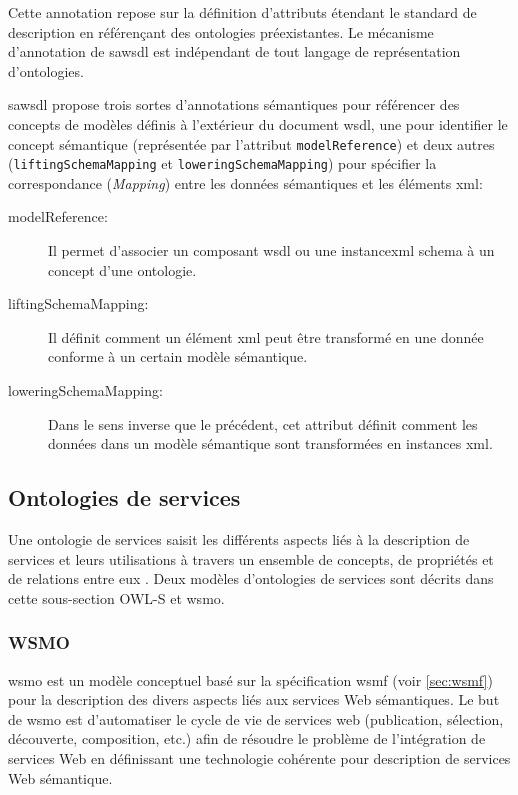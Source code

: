    Cette annotation repose sur la définition d'attributs étendant le
    standard de description en référençant des ontologies
    préexistantes. Le mécanisme d'annotation de \acrshort{sawsdl} est
    indépendant de tout langage de représentation
    \cite{lopez2008selection} d'ontologies.\medskip

    \acrshort{sawsdl} propose trois sortes d'annotations sémantiques
    pour référencer des concepts de modèles définis à l'extérieur du
    document \acrshort{wsdl}, une pour identifier le concept
    sémantique (représentée par l'attribut \texttt{modelReference}) et
    deux autres (\texttt{liftingSchemaMapping} et
    \texttt{loweringSchemaMapping}) pour spécifier la correspondance
    (\emph{Mapping}) entre les données sémantiques et les éléments
    \acrshort{xml}:\bigskip

    \renewcommand{\descriptionlabel}[1]{\hspace{0.5cm}\textbullet~\texttt{#1}}
    \begin{description}
    \item [modelReference:] Il permet d'associer un composant
      \acrshort{wsdl} ou une instance\acrshort{xml} schema à un concept
      d'une ontologie.

    \item [liftingSchemaMapping:] Il définit comment un élément
      \acrshort{xml} peut être transformé en une donnée conforme
      à un certain modèle sémantique.

    \item [loweringSchemaMapping:] Dans le sens inverse que le
      précédent, cet attribut définit comment les données dans un
      modèle sémantique sont transformées en instances \acrshort{xml}.
    \end{description}
    \enddescription

  \subsection{Ontologies de services}
  \label{sec:ontologies-services}
  Une ontologie de services saisit les différents aspects liés à la
  description de services et leurs utilisations à travers un ensemble de
  concepts, de propriétés et de relations entre eux
  \cite{elie2010}. Deux modèles d'ontologies de services sont décrits
  dans cette sous-section \textsc{OWL-S} et \acrshort{wsmo}.

    \subsubsection{WSMO}
    \label{sec:wsmo}
    \acrshort{wsmo} \cite{de2005web} est un modèle conceptuel basé
    sur la spécification \acrshort{wsmf} \cite{fensel2002web} (voir
    \ref{sec:wsmf}) pour la description des divers aspects liés aux
    services Web sémantiques. Le but de \acrshort{wsmo} est
    d'automatiser le cycle de vie de services web (publication,
    sélection, découverte, composition, etc.) afin de résoudre le
    problème de l'intégration de services Web en définissant une
    technologie cohérente pour description de services Web
    sémantique.\medskip

